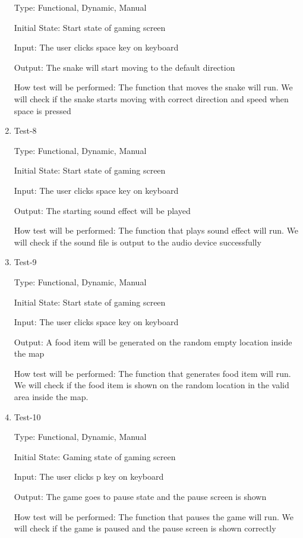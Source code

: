 \documentclass[12pt, titlepage]{article}
\begin{document}
\begin{enumerate}
Type: Functional, Dynamic, Manual

Initial State: Start state of gaming screen

Input: The user clicks space key on keyboard

Output: The snake will start moving to the default direction

How test will be performed: The function that moves the snake will run. We will check if the snake starts moving with correct direction and speed when space is pressed

\item{Test-8\\}

Type: Functional, Dynamic, Manual

Initial State: Start state of gaming screen

Input: The user clicks space key on keyboard

Output: The starting sound effect will be played

How test will be performed: The function that plays sound effect will run. We will check if the sound file is output to the audio device successfully

\item{Test-9\\}

Type: Functional, Dynamic, Manual

Initial State: Start state of gaming screen

Input: The user clicks space key on keyboard

Output: A food item will be generated on the random empty location inside the map

How test will be performed: The function that generates food item will run. We will check if the food item is shown on the random location in the valid area inside the map.

\item{Test-10\\}

Type: Functional, Dynamic, Manual

Initial State: Gaming state of gaming screen

Input: The user clicks p key on keyboard

Output: The game goes to pause state and the pause screen is shown

How test will be performed: The function that pauses the game will run. We will check if the game is paused and the pause screen is shown correctly


\end{enumerate}
\end{document}
